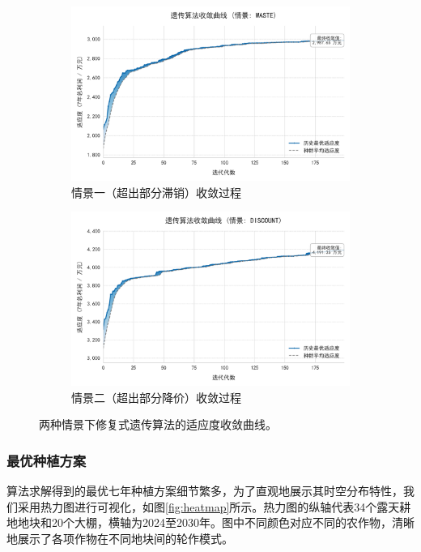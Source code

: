 \begin{figure}[H]
    \centering
    \begin{subfigure}[b]{0.48\textwidth}
        \centering
        \includegraphics[width=\textwidth]{figs/3问题一/情况一ga训练曲线.png}
        \caption{情景一（超出部分滞销）收敛过程}
        \label{fig:conv_case1}
    \end{subfigure}
    \hfill
    \begin{subfigure}[b]{0.48\textwidth}
        \centering
        \includegraphics[width=\textwidth]{figs/3问题一/情况二ga训练曲线.png}
        \caption{情景二（超出部分降价）收敛过程}
        \label{fig:conv_case2}
    \end{subfigure}
    \caption{两种情景下修复式遗传算法的适应度收敛曲线。}
    \label{fig:convergence}
\end{figure}

\subsubsection{最优种植方案}
算法求解得到的最优七年种植方案细节繁多，为了直观地展示其时空分布特性，我们采用热力图进行可视化，如图\ref{fig:heatmap}所示。热力图的纵轴代表34个露天耕地地块和20个大棚，横轴为2024至2030年。图中不同颜色对应不同的农作物，清晰地展示了各项作物在不同地块间的轮作模式。

